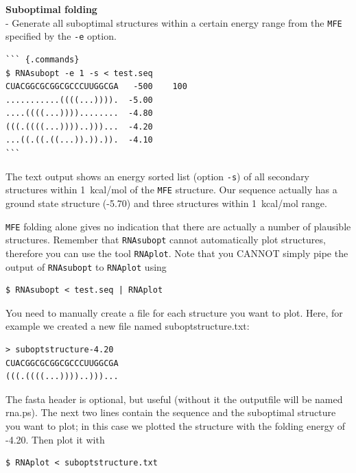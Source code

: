 \documentclass[]{article}
\begin{document}
\textbf{Suboptimal folding}\\
- Generate all suboptimal structures within a certain energy range from
the \texttt{MFE} specified by the \texttt{-e} option.

\begin{verbatim}
``` {.commands}
$ RNAsubopt -e 1 -s < test.seq
CUACGGCGCGGCGCCCUUGGCGA   -500    100
...........((((...)))).  -5.00
....((((...))))........  -4.80
(((.((((...))))..)))...  -4.20
...((.((.((...)).)).)).  -4.10
```
\end{verbatim}

The text output shows an energy sorted list (option \texttt{-s}) of all
secondary structures within 1~kcal/mol of the \texttt{MFE} structure.
Our sequence actually has a ground state structure (-5.70) and three
structures within 1~kcal/mol range.

\texttt{MFE} folding alone gives no indication that there are actually a
number of plausible structures. Remember that \texttt{RNAsubopt} cannot
automatically plot structures, therefore you can use the tool
\texttt{RNAplot}. Note that you CANNOT simply pipe the output of
\texttt{RNAsubopt} to \texttt{RNAplot} using

\begin{verbatim}
$ RNAsubopt < test.seq | RNAplot
\end{verbatim}

You need to manually create a file for each structure you want to plot.
Here, for example we created a new file named suboptstructure.txt:

\begin{verbatim}
> suboptstructure-4.20
CUACGGCGCGGCGCCCUUGGCGA
(((.((((...))))..)))...
\end{verbatim}

The fasta header is optional, but useful (without it the outputfile will
be named rna.ps). The next two lines contain the sequence and the
suboptimal structure you want to plot; in this case we plotted the
structure with the folding energy of -4.20. Then plot it with

\begin{verbatim}
$ RNAplot < suboptstructure.txt
\end{verbatim}
\end{document}
